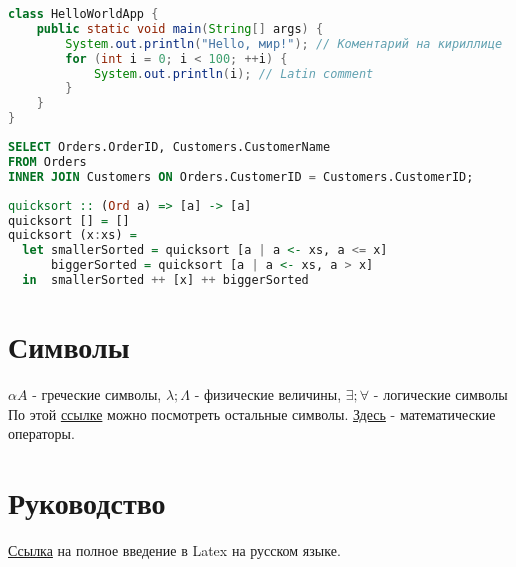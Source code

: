 \begin{lstlisting}[language=Java, caption=Кириллица в листинге не имеет подсветки]
class HelloWorldApp {
    public static void main(String[] args) {
        System.out.println("Hello, мир!"); // Коментарий на кириллице
        for (int i = 0; i < 100; ++i) {
            System.out.println(i); // Latin comment
        }
    }
}
\end{lstlisting}

\begin{lstlisting}[language=SQL, caption=Пример на SQL]
SELECT Orders.OrderID, Customers.CustomerName
FROM Orders
INNER JOIN Customers ON Orders.CustomerID = Customers.CustomerID;
\end{lstlisting}

\begin{lstlisting}[language=haskell, caption=Пример на Haslkell]
quicksort :: (Ord a) => [a] -> [a]
quicksort [] = []
quicksort (x:xs) =
  let smallerSorted = quicksort [a | a <- xs, a <= x]
      biggerSorted = quicksort [a | a <- xs, a > x]
  in  smallerSorted ++ [x] ++ biggerSorted
\end{lstlisting}








\section{Символы}
$\alpha A$ - греческие символы,  $ \lambda; \Lambda$ - физические величины, $\exists; \forall$ - логические символы\\
По этой   \href{https://www.overleaf.com/learn/latex/List_of_Greek_letters_and_math_symbols}{ссылке} можно посмотреть остальные символы. \href{https://www.overleaf.com/learn/latex/Operators}{Здесь} - математические операторы.



\section{Руководство}
\href{https://www.texlive.info/CTAN/info/lshort/russian/lshortru.pdf}{Ссылка} на полное введение в Latex на русском языке.


\newpage
